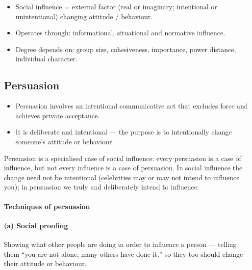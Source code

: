 \begin{QuickRevision}
\begin{itemize}
\item Social influence = external factor (real or imaginary; intentional or unintentional) changing attitude / behaviour.
\item Operates through: informational, situational and normative influence.
\item Degree depends on: group size, cohesiveness, importance, power distance, individual character.
\end{itemize}
\end{QuickRevision}

\subsection{Persuasion}

\begin{KeyConcept}
\begin{itemize}
\item Persuasion involves an intentional communicative act that excludes force and achieves private acceptance.
\item It is deliberate and intentional --- the purpose is to intentionally change someone's attitude or behaviour.
\end{itemize}
\end{KeyConcept}

\begin{CriticalPoint}
Persuasion is a specialised case of social influence: every persuasion is a case of influence, but not every influence is a case of persuasion. In social influence the change need not be intentional (celebrities may or may not intend to influence you); in persuasion we truly and deliberately intend to influence.
\end{CriticalPoint}

\paragraph{Techniques of persuasion}

\paragraph{(a) Social proofing} Showing what other people are doing in order to influence a person --- telling them ``you are not alone, many others have done it,'' so they too should change their attitude or behaviour.

